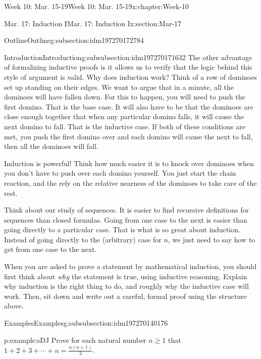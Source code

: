 \documentclass[oneside,10pt,]{book}
\numberwithin{equation}{section}
\renewcommand{\ge}{\geqslant}
\begin{document}
\begin{chapterptx}{Week 10: Mar. 15-19}{}{Week 10: Mar. 15-19}{}{}{x:chapter:Week-10}
\begin{sectionptx}{Mar. 17: Induction I}{}{Mar. 17: Induction I}{}{}{x:section:Mar-17}
\begin{subsectionptx}{Outline}{}{Outline}{}{}{g:subsection:idm197270172784}
\begin{subsubsectionptx}{Introduction}{}{Introduction}{}{}{g:subsubsection:idm197270171632}
The other advantage of formalizing inductive proofs is it allows us to verify that the logic behind this style of argument is valid. Why does induction work? Think of a row of dominoes set up standing on their edges. We want to argue that in a minute, all the dominoes will have fallen down. For this to happen, you will need to push the first domino. That is the base case. It will also have to be that the dominoes are close enough together that when any particular domino falls, it will cause the next domino to fall. That is the inductive case. If both of these conditions are met, you push the first domino over and each domino will cause the next to fall, then all the dominoes will fall.%
\par
Induction is powerful! Think how much easier it is to knock over dominoes when you don't have to push over each domino yourself. You just start the chain reaction, and the rely on the relative nearness of the dominoes to take care of the rest.%
\par
Think about our study of sequences. It is easier to find recursive definitions for sequences than closed formulas. Going from one case to the next is easier than going directly to a particular case. That is what is so great about induction. Instead of going directly to the (arbitrary) case for \(n\), we just need to say how to get from one case to the next.%
\par
When you are asked to prove a statement by mathematical induction, you should first think about \emph{why} the statement is true, using inductive reasoning. Explain why induction is the right thing to do, and roughly why the inductive case will work. Then, sit down and write out a careful, formal proof using the structure above.%
\end{subsubsectionptx}
%
%
\typeout{************************************************}
\typeout{************************************************}
%
\begin{subsubsectionptx}{Examples}{}{Examples}{}{}{g:subsubsection:idm197270140176}
\begin{example}{}{p:example:sDJ}%
Prove for each natural number \(n \ge 1\) that \(1 + 2 + 3 + \cdots + n = \frac{n(n+1)}{2}\).%
\par\smallskip%

\end{example}
\end{subsubsectionptx}
\end{subsectionptx}
\end{sectionptx}
\end{chapterptx}
\end{document}
